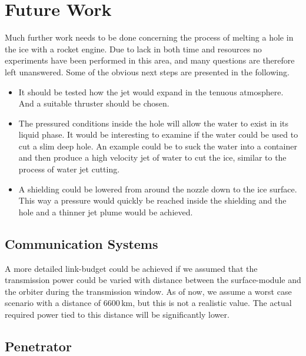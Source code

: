 \chapter{Future Work}


Much further work needs to be done concerning the process of melting a hole in the ice with a rocket engine. Due to lack in both time and resources no experiments have been performed in this area, and many questions are therefore left unanswered. Some of the obvious next steps are presented in the following.
\begin{itemize}
\item It should be tested how the jet would expand in the tenuous atmosphere. And a suitable thruster should be chosen.

\item The pressured conditions inside the hole will allow the water to exist in its liquid phase. It would be interesting to examine if the water could be used to cut a slim deep hole. An example could be to suck the water into a container and then produce a high velocity jet of water to cut the ice, similar to the process of water jet cutting.

\item A shielding could be lowered from around the nozzle down to the ice surface. This way a pressure would quickly be reached inside the shielding and the hole and a thinner jet plume would be achieved.
\end{itemize}

\section{Communication Systems}


A more detailed link-budget could be achieved if we assumed that the transmission power could be varied with distance between the surface-module and the orbiter during the transmission window. As of now, we assume a worst case scenario with a distance of $6600\,\mathrm{km}$, but this is not a realistic value. The actual required power tied to this distance will be significantly lower.\\

\section{Penetrator}


